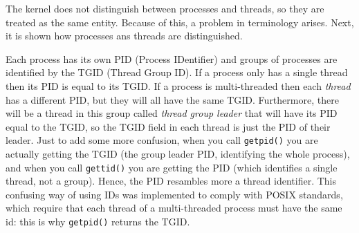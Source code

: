 The kernel does not distinguish between processes and threads, so they are treated as the same entity. Because of this, a problem in terminology arises. Next, it is shown how processes ans threads are distinguished.

Each process has its own PID (Process IDentifier) and groups of processes are identified by the TGID (Thread Group ID). If a process only has a single thread then its PID is equal to its TGID. If a process is multi-threaded then each \textit{thread} has a different PID, but they will all have the same TGID. Furthermore, there will be a thread in this group called \textit{thread group leader} that will have its PID equal to the TGID, so the TGID field in each thread is just the PID of their leader. Just to add some more confusion, when you call \verb|getpid()| you are actually getting the TGID (the group leader PID, identifying the whole process), and when you call \verb|gettid()| you are getting the PID (which identifies a single thread, not a group). Hence, the PID resambles more a thread identifier.
This confusing way of using IDs was implemented to comply with POSIX standards, which require that each thread of a multi-threaded process must have the same id: this is why \verb|getpid()| returns the TGID.

